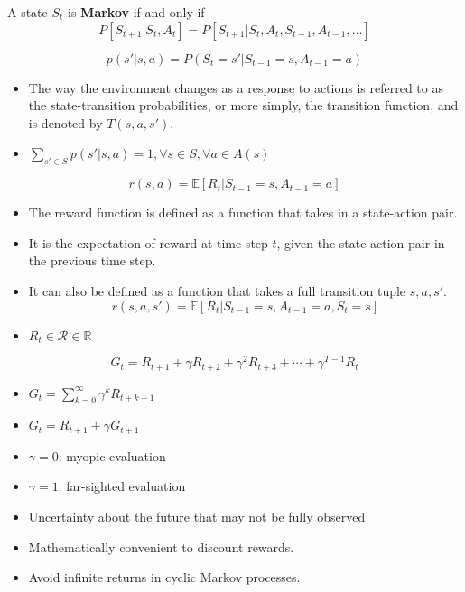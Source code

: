 \begin{definition}
	A state $S_t$ is \textbf{Markov} if and only if 
	$$P[S_{t+1}|S_t, A_t] = P[S_{t+1}|S_t, A_t, S_{t-1},A_{t-1},...]$$
\end{definition}

\begin{definition}
	$$p(s'|s,a) = P(S_t=s'|S_{t-1}=s,A_{t-1}=a)$$
\end{definition}
\begin{itemize}
	\item The way the environment changes as a response to actions is referred to as the state-transition probabilities, or more simply, the transition function, and is denoted by $T(s,a,s')$.
	\item $\sum_{s'\in S}p(s'|s,a) = 1, \forall s \in S, \forall a\in A(s)$
\end{itemize}

\begin{definition}
	$$r(s,a) =\mathbb{E}[R_t|S_{t-1}=s,A_{t-1}=a] $$
\end{definition}
\begin{itemize}
	\item The reward function is defined as a function that takes in a state-action pair.
	\item It is the expectation of reward at time step $t$, given the state-action pair in the previous time step.
	\item It can also be defined as a function that takes a full transition tuple $s,a,s'$.
		$$r(s,a,s') =\mathbb{E}[R_t|S_{t-1}=s,A_{t-1}=a,S_{t}=s]$$
	\item $R_t\in \mathcal{R}\in \mathbb{R}$
\end{itemize}

\begin{definition}
	$$G_t = R_{t+1}+\gamma R_{t+2}+\gamma^2 R_{t+3}+\cdots+\gamma^{T-1} R_{t} $$
\end{definition}
\begin{itemize}
	\item $G_t = \sum_{k=0}^{\infty}\gamma^k R_{t+k+1}$
	\item $G_t = R_{t+1}+\gamma G_{t+1}$
	\item $\gamma=0$: myopic evaluation
	\item $\gamma=1$: far-sighted evaluation
	\item Uncertainty about the future that may not be fully observed
	\item Mathematically convenient to discount rewards. 
	\item Avoid infinite returns in cyclic Markov processes.
\end{itemize}

